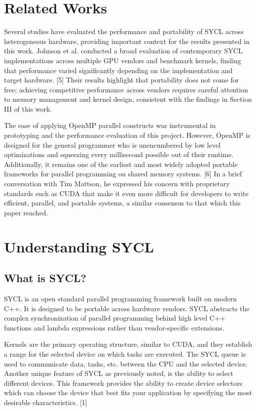 \documentclass[journal]{IEEEtran}
\begin{document}
\section{Related Works}
\par Several studies have evaluated the performance and portability of SYCL across heterogeneous hardware, providing important context for the results presented in this work. Johnson et al. conducted a broad evaluation of contemporary SYCL implementations across multiple GPU vendors and benchmark kernels, finding that performance varied significantly depending on the implementation and target hardware. [5] Their results highlight that portability does not come for free; achieving competitive performance across vendors requires careful attention to memory management and kernel design, consistent with the findings in Section III of this work.
\par The ease of applying OpenMP parallel constructs was instrumental in prototyping and the performance evaluation of this project. However, OpenMP is designed for the general programmer who is unencumbered by low level optimizations and squeezing every millisecond possible out of their runtime. Additionally, it remains one of the earliest and most widely adopted portable frameworks for parallel programming on shared memory systems. [6] In a brief conversation with Tim Mattson, he expressed his concern with proprietary standards such as CUDA that make it even more difficult for developers to write efficient, parallel, and portable systems, a similar consensus to that which this paper reached.

\section{Understanding SYCL}
\subsection{What is SYCL?}
 \par SYCL is an open standard parallel programming framework built on modern C++. It is designed to be portable across hardware vendors. SYCL abstracts the complex synchronization of parallel programming behind high level C++ functions and lambda expressions rather than vendor-specific extensions. 
 \par Kernels are the primary operating structure, similar to CUDA, and they establish a range for the selected device on which tasks are executed. The SYCL queue is used to communicate data, tasks, etc. between the CPU and the selected device. Another unique feature of SYCL as previously noted, is the ability to select different devices. This framework provides the ability to create device selectors which can choose the device that best fits your application by specifying the most desirable characteristics. [1]
\end{document}

